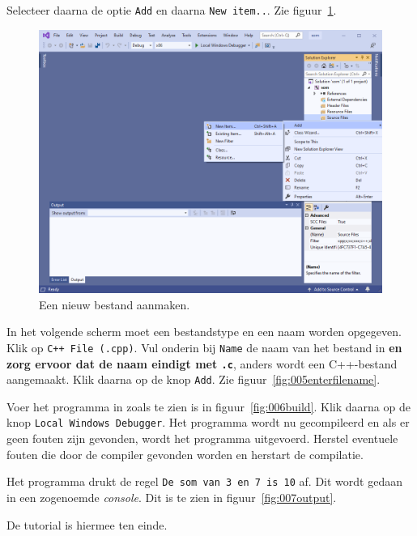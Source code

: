 \documentclass[a4paper,10pt,fleqn,twoside]{article}
\begin{document}
Selecteer daarna de optie \texttt{Add} en daarna \texttt{New item..}. Zie figuur~\ref{fig:004addnewitem}.

\begin{figure}[H]
\centering
\includegraphics[scale=0.5]{004addnewitem}
\caption{Een nieuw bestand aanmaken.}
\label{fig:004addnewitem}
\end{figure}

In het volgende scherm moet een bestandstype en een naam worden opgegeven. Klik op \texttt{C++ File (.cpp)}. Vul onderin bij  \texttt{Name} de naam van het bestand in \textbf{en zorg ervoor dat de naam eindigt met \texttt{.c}}, anders wordt een C++-bestand aangemaakt. Klik daarna op de knop \texttt{Add}. Zie figuur~\ref{fig:005enterfilename}.

Voer het programma in zoals te zien is in figuur~\ref{fig:006build}. Klik daarna op de knop \texttt{Local Windows Debugger}. Het programma wordt nu gecompileerd en als er geen fouten zijn gevonden, wordt het programma uitgevoerd. Herstel eventuele fouten die door de compiler gevonden worden en herstart de compilatie.

Het programma drukt de regel \texttt{De som van 3 en 7 is 10} af. Dit wordt gedaan in een zogenoemde \textsl{console}. Dit is te zien in figuur~\ref{fig:007output}.

De tutorial is hiermee ten einde.
\end{document}
